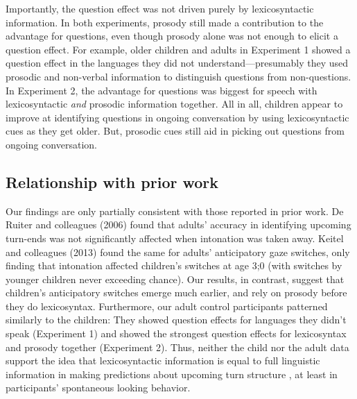 \documentclass[authoryear, 12pt]{elsarticle}
\begin{document}
Importantly, the question effect was not driven purely by lexicosyntactic information. In both experiments, prosody still made a contribution to the advantage for questions, even though prosody alone was not enough to elicit a question effect. For example, older children and adults in Experiment 1 showed a question effect in the languages they did not understand---presumably they used prosodic and non-verbal information to distinguish questions from non-questions. In Experiment 2, the advantage for questions was biggest for speech with lexicosyntactic \textit{and} prosodic information together. All in all, children appear to improve at identifying questions in ongoing conversation by using lexicosyntactic cues as they get older. But, prosodic cues still aid in picking out questions from ongoing conversation.

\subsection{Relationship with prior work}

Our findings are only partially consistent with those reported in prior work. De Ruiter and colleagues (2006) found that adults' accuracy in identifying upcoming turn-ends was not significantly affected when intonation was taken away. Keitel and colleagues (2013) found the same for adults' anticipatory gaze switches, only finding that intonation affected children's switches at age 3;0 (with switches by younger children never exceeding chance). Our results, in contrast, suggest that children's anticipatory switches emerge much earlier, and rely on prosody before they do lexicosyntax. Furthermore, our adult control participants patterned similarly to the children: They showed question effects for languages they didn't speak (Experiment 1) and showed the strongest question effects for lexicosyntax and prosody together (Experiment 2). Thus, neither the child nor the adult data support the idea that lexicosyntactic information is equal to full linguistic information in making predictions about upcoming turn structure \citep{de-ruiter2006}, at least in participants' spontaneous looking behavior.
\end{document}

